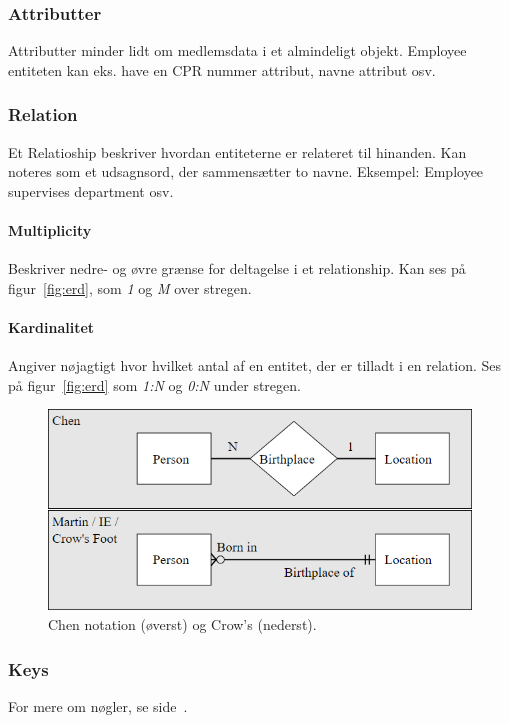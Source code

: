 \subsubsection{Attributter}
Attributter minder lidt om medlemsdata i et almindeligt objekt. Employee entiteten kan eks. have en CPR nummer attribut, navne attribut osv.

\subsubsection{Relation}
Et Relatioship beskriver hvordan entiteterne er relateret til hinanden. Kan noteres som et udsagnsord, der sammensætter to navne. Eksempel: Employee supervises department osv.

\paragraph{Multiplicity} 
Beskriver nedre- og øvre grænse for deltagelse i et relationship. Kan ses på figur~\ref{fig:erd}, som \textit{1} og \textit{M} over stregen.

\paragraph{Kardinalitet}
Angiver nøjagtigt hvor hvilket antal af en entitet, der er tilladt i en relation. Ses på figur~\ref{fig:erd} som \textit{1:N} og \textit{0:N} under stregen.

\begin{figure}[h]
	\centering
	\includegraphics[width=0.8\linewidth]{figs/spm1/notation}
	\caption{Chen notation (øverst) og Crow's (nederst).}
	\label{fig:notation}
\end{figure}

\subsubsection{Keys}
For mere om nøgler, se side~\pageref{sec:keys}.

